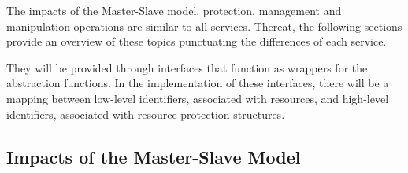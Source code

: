 		The impacts of the Master-Slave model, protection, management and manipulation 
		operations are similar to all services.
		Thereat, the following sections provide an overview of these topics punctuating 
		the differences of each service.

		They will be provided through interfaces that function as wrappers
		for the \hal abstraction functions.
		In the implementation of these interfaces, there will be a mapping
		between low-level identifiers, associated with \hal resources,
		and high-level identifiers, associated with resource protection structures.



		\subsection{Impacts of the Master-Slave Model}



